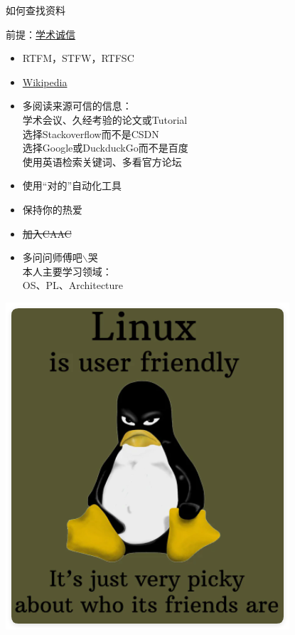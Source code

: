 \documentclass[aspectratio=1610]{beamer}
\begin{document}
\begin{frame}{如何查找资料}
    \begin{minipage}{0.63\linewidth}
        前提：\href{https://integrity.mit.edu/}{\alert{学术诚信}}
        \begin{center}
            \begin{itemize}
                \item RTFM，STFW，RTFSC
                \item \href{https://wikipedia.org}{Wikipedia}
                \item 多阅读来源可信的信息：\\ 学术会议、久经考验的论文或Tutorial \\ 选择Stackoverflow而不是CSDN \\ 选择Google或DuckduckGo而不是百度 \\ 使用英语检索关键词、多看官方论坛
                \item 使用“对的”自动化工具
                \item 保持你的热爱
                \item \sout{加入CAAC}
                \item 多问问师傅吧$\backslash\textrm{哭}$ \\ 本人主要学习领域：\\ OS、PL、Architecture
            \end{itemize}
        \end{center}
    \end{minipage}
    \begin{minipage}{0.35\linewidth}
        \centering
        \includegraphics[width=\linewidth]{pic/userFriendly.png}
    \end{minipage}
\end{frame}
\end{document}
